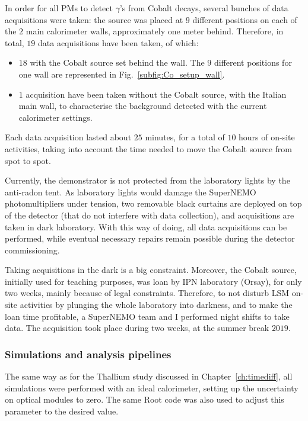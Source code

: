 In order for all PMs to detect $\gamma$'s from Cobalt decays, several bunches of data acquisitions were taken:
the source was placed at $9$ different positions on each of the $2$ main calorimeter walls, approximately one meter behind.
Therefore, in total, $19$ data acquisitions have been taken, of which:
\begin{itemize}
\item $18$ with the Cobalt source set behind the wall. The $9$ different positions for one wall are represented in Fig.~\ref{subfig:Co_setup_wall}.
\item $1$ acquisition have been taken without the Cobalt source, with the Italian main wall, to characterise the background detected with the current calorimeter settings.
\end{itemize}
Each data acquisition lasted about $25$ minutes, for a total of $10$ hours of on-site activities, taking into account the time needed to move the Cobalt source from spot to spot.

Currently, the demonstrator is not protected from the laboratory lights by the anti-radon tent.
As laboratory lights would damage the SuperNEMO photomultipliers under tension, two removable black curtains are deployed on top of the detector (that do not interfere with data collection), and acquisitions are taken in dark laboratory.
With this way of doing, all data acquisitions can be performed, while eventual necessary repairs remain possible during the detector commissioning.

Taking acquisitions in the dark is a big constraint.
Moreover, the Cobalt source, initially used for teaching purposes, was loan by IPN laboratory (Orsay), for only two weeks, mainly because of legal constraints.
Therefore, to not disturb LSM on-site activities by plunging the whole laboratory into darkness, and to make the loan time profitable, a SuperNEMO team and I performed night shifts to take data.
The acquisition took place during two weeks, at the summer break $2019$.

\subsubsection*{Simulations and analysis pipelines}

The same way as for the Thallium study discussed in Chapter~\ref{ch:timediff}, all simulations were performed with an ideal calorimeter, setting up the uncertainty on optical modules to zero.
The same Root code was also used to adjust this parameter to the desired value.

